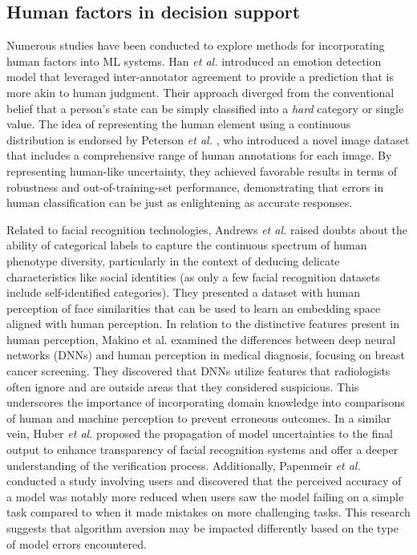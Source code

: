 \subsection{Human factors in decision support}
Numerous studies have been conducted to explore methods for incorporating human factors into ML systems. Han {\em et al.} \cite{han2017hard} introduced an emotion detection model that leveraged inter-annotator agreement to provide a prediction that is more akin to human judgment. Their approach diverged from the conventional belief that a person's state can be simply classified into a \textit{hard} category or single value.
The idea of representing the human element using a continuous distribution is endorsed by Peterson {\em et al.} \cite{peterson2019human}, who introduced a novel image dataset that includes a comprehensive range of human annotations for each image. By representing human-like uncertainty, they achieved favorable results in terms of robustness and out-of-training-set performance, demonstrating that errors in human classification can be just as enlightening as accurate responses. 
%

Related to facial recognition technologies, Andrews {\em et al.} \cite{andrews2023view} raised doubts about the ability of categorical labels to capture the continuous spectrum of human phenotype diversity, particularly in the context of deducing delicate characteristics like social identities (as only a few facial recognition datasets include self-identified categories). They presented a dataset with human perception of face similarities that can be used to learn an embedding space aligned with human perception.
In relation to the distinctive features present in human perception, Makino et al. \cite{makino2022differences} examined the differences between deep neural networks (DNNs) and human perception in medical diagnosis, focusing on breast cancer screening. They discovered that DNNs utilize features that radiologists often ignore and are outside areas that they considered suspicious. This underscores the importance of incorporating domain knowledge into comparisons of human and machine perception to prevent erroneous outcomes.
%
In a similar vein, Huber {\em et al.} \cite{huber2022stating} proposed the propagation of model uncertainties to the final output to enhance transparency of facial recognition systems and offer a deeper understanding of the verification process. 
%
Additionally, Papenmeir {\em et al.} \cite{papenmeier2022accurate} conducted a study involving users and discovered that the perceived accuracy of a model was notably more reduced when users saw the model failing on a simple task compared to when it made mistakes on more challenging tasks. This research suggests that algorithm aversion may be impacted differently based on the type of model errors encountered.
%

